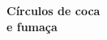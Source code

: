 \pagebreak
\blankpage






\begingroup\thispagestyle{empty}\vspace*{.05\textheight} 


            \formular
            \Huge 
            \noindent
            \textbf{Círculos de coca\\e fumaça}
            \smallskip
                      
            \large
            \noindent\textit{}
            \normalsize 
            \vspace{2em}
                    
\endgroup
\vfill
\pagebreak